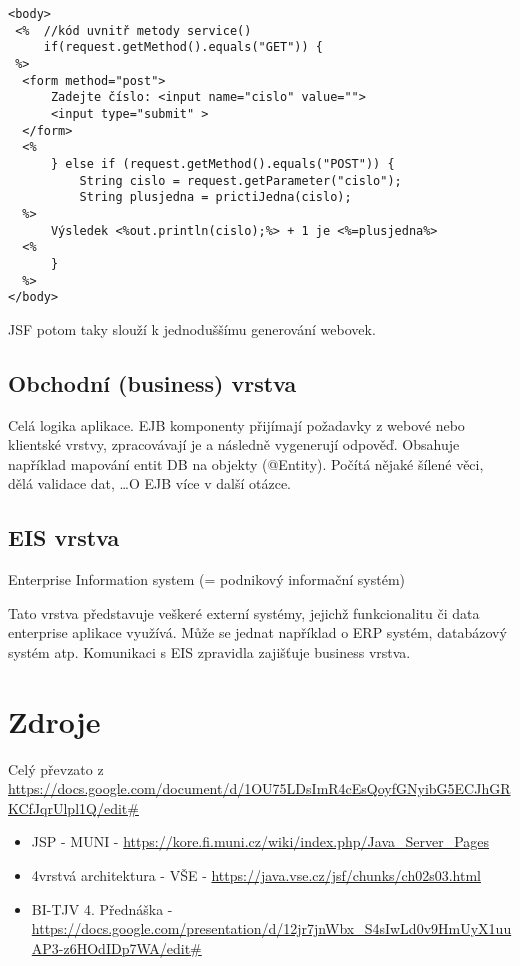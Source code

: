\documentclass{szzclass}
\begin{document}
\begin{verbatim}
<body>
 <%  //kód uvnitř metody service()
     if(request.getMethod().equals("GET")) {
 %>
  <form method="post">
      Zadejte číslo: <input name="cislo" value="">
      <input type="submit" >
  </form>
  <%
      } else if (request.getMethod().equals("POST")) {
          String cislo = request.getParameter("cislo");
          String plusjedna = prictiJedna(cislo);
  %>
      Výsledek <%out.println(cislo);%> + 1 je <%=plusjedna%> 
  <%
      }
  %>
</body>
\end{verbatim}

JSF potom taky slouží k jednoduššímu generování webovek.

\subsection{Obchodní (business) vrstva}
Celá logika aplikace. EJB komponenty přijímají požadavky z webové nebo klientské vrstvy, zpracovávají je a následně vygenerují odpověď. Obsahuje například mapování entit DB na objekty (@Entity). Počítá nějaké šílené věci, dělá validace dat, \dots O EJB více v další otázce.

\subsection{EIS vrstva}
Enterprise Information system (= podnikový informační systém)

Tato vrstva představuje veškeré externí systémy, jejichž funkcionalitu či data enterprise aplikace využívá. Může se jednat například o ERP systém, databázový systém atp. Komunikaci s EIS zpravidla zajišťuje business vrstva.

\section{Zdroje}
Celý převzato z \url{https://docs.google.com/document/d/1OU75LDsImR4cEsQoyfGNyibG5ECJhGRKCfJqrUlpl1Q/edit#}
\begin{itemize}
  \item JSP - MUNI - \url{https://kore.fi.muni.cz/wiki/index.php/Java_Server_Pages }
  \item 4vrstvá architektura - VŠE - \url{https://java.vse.cz/jsf/chunks/ch02s03.html}
  \item BI-TJV 4. Přednáška - \url{https://docs.google.com/presentation/d/12jr7jnWbx_S4sIwLd0v9HmUyX1uuAP3-z6HOdIDp7WA/edit#}
\end{itemize}
\end{document}

